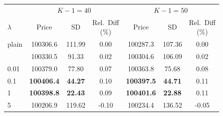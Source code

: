 \begin{table}
\begin{tabular}[t]{lcccccc}
\multicolumn{1}{c}{ } & \multicolumn{3}{c}{$K-1 = 40$} & \multicolumn{3}{c}{$K-1 = 50$} \\
\cmidrule(l{3pt}r{3pt}){2-4} \cmidrule(l{3pt}r{3pt}){5-7}
$\lambda$ & Price & SD & \shortstack{Rel.\ Diff\\(\%)} & Price & SD & \shortstack{Rel.\ Diff\\(\%)}\\
\midrule
plain & 100306.6 & 111.99 & 0.00 & 100287.3 & 107.36 & 0.00\\
\addlinespace
0.001 & 100330.5 & 91.33 & 0.02 & 100304.6 & 106.09 & 0.02\\
0.01 & 100379.0 & 77.80 & 0.07 & 100363.8 & 75.68 & 0.08\\
0.1 & \textbf{100406.4} & \textbf{44.27} & 0.10 & \textbf{100397.5} & \textbf{44.71} & 0.11\\
1 & \textbf{100398.8} & \textbf{22.43} & 0.09 & \textbf{100401.6} & \textbf{22.88} & 0.11\\
5 & 100206.9 & 119.62 & -0.10 & 100234.4 & 136.52 & -0.05\\
\bottomrule
\end{tabular}
\end{table}

